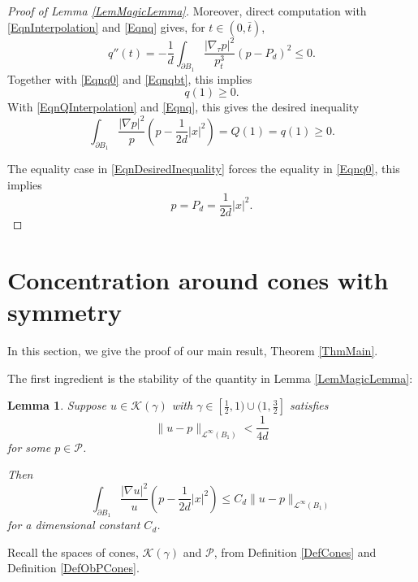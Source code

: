 \documentclass{amsart}
\def\PB{\partial B_1}
\def\KGa{\mathcal{K}(\gamma)}
\def\P{\mathcal{P}}
\newtheorem{lem}[thm]{Lemma}
\theoremstyle{definition}
\numberwithin{equation}{section}
\theoremstyle{remark}
\begin{document}
\begin{proof}[Proof of Lemma \ref{LemMagicLemma}]
Moreover, direct computation with \eqref{EqnInterpolation} and \eqref{Eqnq} gives, for $t\in(0,\bar t)$,
$$
q''(t)=-\frac{1}{d}\int_{\PB}\frac{|\nabla_\tau p|^2}{p_t^3}(p-P_d)^2\le 0.
$$
Together with \eqref{Eqnq0} and \eqref{Eqnqbt}, this implies 
$$q(1)\ge0.$$
With \eqref{EqnQInterpolation} and \eqref{Eqnq}, this gives the desired inequality 
\begin{equation}
\label{EqnDesiredInequality}
\int_{\PB}\frac{|\nabla p|^2}{p}(p-\frac{1}{2d}|x|^2)=Q(1)=q(1)\ge0.
\end{equation}

The equality case in \eqref{EqnDesiredInequality} forces the equality in \eqref{Eqnq0}, this implies
$$
p=P_d=\frac{1}{2d}|x|^2.
$$
\end{proof} 


\section{Concentration around cones with symmetry}
\label{SectionConesWithSymmetry}

In this section, we give the proof of our main result, Theorem \ref{ThmMain}. 

The first ingredient is the stability of the quantity in Lemma \ref{LemMagicLemma}:
\begin{lem}
\label{LemMagicLemmaForV}
Suppose $u\in\KGa$ with $\gamma\in[\frac12,1)\cup(1,\frac32]$ satisfies
\begin{equation}
\label{EqnVMinusP}
\|u-p\|_{\mathcal{L}^\infty(B_1)}<\frac{1}{4d}
\end{equation}
for some $p\in\P$.

Then 
$$
\int_{\partial B_1}\frac{|\nabla u|^2}{u}(p-\frac{1}{2d}|x|^2)\le  C_d\|u-p\|_{\mathcal{L}^\infty(B_1)}
$$
for a dimensional constant $C_d$.
\end{lem} 
Recall the spaces of cones, $\KGa$ and $\P$, from Definition \ref{DefCones} and Definition \ref{DefObPCones}.
\end{document}
